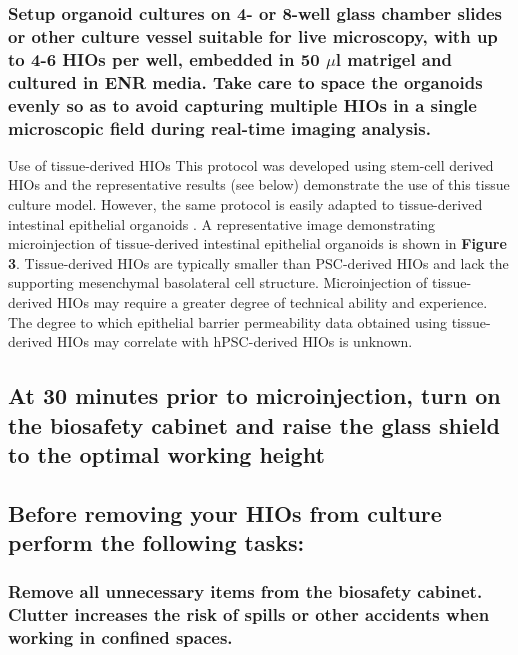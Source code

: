 \documentclass[11pt]{article}
\begin{document}
\subsubsection{{\bfseries\sffamily } Setup organoid cultures on 4- or 8-well glass chamber slides or other culture vessel suitable for live microscopy, with up to 4-6 HIOs per well, embedded in 50 \(\mu\)l matrigel and cultured in ENR media. Take care to space the organoids evenly so as to avoid capturing multiple HIOs in a single microscopic field during real-time imaging analysis.}
\label{sec:orgheadline12}
\begin{bclogo}[logo=\bcinfo, couleurBarre=Black, noborder=true, couleur=gray!10]{     Use of tissue-derived HIOs}
This protocol was developed using stem-cell derived HIOs and the representative results (see below) demonstrate the use of this tissue culture model. However, the same protocol is easily adapted to tissue-derived intestinal epithelial organoids \supercite{Sato:2009,Miyoshi:2013}. A representative image demonstrating microinjection of tissue-derived intestinal epithelial organoids is shown in \textbf{Figure 3}. Tissue-derived HIOs are typically smaller than PSC-derived HIOs and lack the supporting mesenchymal basolateral cell structure\supercite{Sato:2009,Miyoshi:2013,Sato:2011}. Microinjection of tissue-derived HIOs may require a greater degree of technical ability and experience. The degree to which epithelial barrier permeability data obtained using tissue-derived HIOs may correlate with hPSC-derived HIOs is unknown.\\
\end{bclogo}

\subsection{{\bfseries\sffamily } At 30 minutes prior to microinjection, turn on the biosafety cabinet and raise the glass shield to the optimal working height}
\label{sec:orgheadline14}
\subsection{{\bfseries\sffamily } Before removing your HIOs from culture perform the following tasks:}
\label{sec:orgheadline41}
\subsubsection{{\bfseries\sffamily } Remove all unnecessary items from the biosafety cabinet. Clutter increases the risk of spills or other accidents when working in confined spaces.}
\label{sec:orgheadline15}
\end{document}
